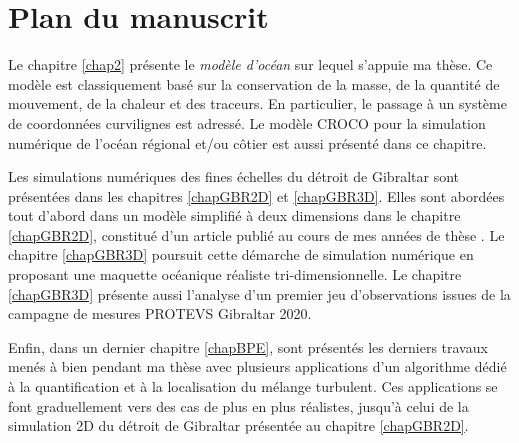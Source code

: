 \section{Plan du manuscrit}

Le chapitre \ref{chap2} présente le \textit{modèle d'océan} sur lequel s'appuie ma thèse. Ce modèle est classiquement basé sur la conservation de la masse, de la quantité de mouvement, de la chaleur et des traceurs. En particulier, le passage à un système de coordonnées curvilignes est adressé. Le modèle  CROCO pour la simulation numérique de l'océan régional et/ou côtier est aussi présenté dans ce chapitre.

Les simulations numériques des fines échelles du détroit de Gibraltar sont présentées dans les chapitres \ref{chapGBR2D} et \ref{chapGBR3D}. Elles sont abordées tout d'abord dans un modèle simplifié à deux dimensions dans le chapitre \ref{chapGBR2D}, constitué d'un article publié au cours de mes années de thèse \citep{hilt_2020}. Le chapitre \ref{chapGBR3D} poursuit cette démarche de simulation numérique en proposant une maquette océanique réaliste tri-dimensionnelle. Le chapitre \ref{chapGBR3D} présente aussi l'analyse d'un premier jeu d'observations issues de la campagne de mesures PROTEVS Gibraltar 2020.

Enfin, dans un dernier chapitre \ref{chapBPE}, sont présentés les derniers travaux menés à bien pendant ma thèse avec plusieurs applications d'un algorithme dédié à la quantification et à la localisation du mélange turbulent. Ces applications se font graduellement vers des cas de plus en plus réalistes, jusqu'à celui de la simulation 2D du détroit de Gibraltar présentée au chapitre \ref{chapGBR2D}.

